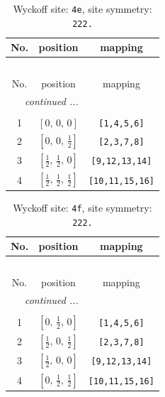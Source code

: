 \documentclass[fleqn,8pt]{jsarticle}
\begin{document}
\renewcommand{\arraystretch}{1.2}
\begin{longtable}{ccc}
\caption{Wyckoff site: {\tt 4e}, site symmetry: {\tt 222.}}
 \\
 \hline \hline
No. & position & mapping \\ \hline \endfirsthead

\multicolumn{2}{l}{\tablename\ \thetable{}} \\
 \hline \hline
No. & position & mapping \\ \hline \endhead

 \hline \hline
\multicolumn{2}{r}{\footnotesize\it continued ...} \\ \endfoot

 \hline \hline
\multicolumn{2}{r}{} \\ \endlastfoot

1 & $\left[ 0,\, 0,\, 0 \right]$ & {\tt [1,4,5,6]} \\ \hline
2 & $\left[ 0,\, 0,\, \frac{1}{2} \right]$ & {\tt [2,3,7,8]} \\ \hline
3 & $\left[ \frac{1}{2},\, \frac{1}{2},\, 0 \right]$ & {\tt [9,12,13,14]} \\ \hline
4 & $\left[ \frac{1}{2},\, \frac{1}{2},\, \frac{1}{2} \right]$ & {\tt [10,11,15,16]} \\
\end{longtable}
\renewcommand{\arraystretch}{1.2}
\begin{longtable}{ccc}
\caption{Wyckoff site: {\tt 4f}, site symmetry: {\tt 222.}}
 \\
 \hline \hline
No. & position & mapping \\ \hline \endfirsthead

\multicolumn{2}{l}{\tablename\ \thetable{}} \\
 \hline \hline
No. & position & mapping \\ \hline \endhead

 \hline \hline
\multicolumn{2}{r}{\footnotesize\it continued ...} \\ \endfoot

 \hline \hline
\multicolumn{2}{r}{} \\ \endlastfoot

1 & $\left[ 0,\, \frac{1}{2},\, 0 \right]$ & {\tt [1,4,5,6]} \\ \hline
2 & $\left[ \frac{1}{2},\, 0,\, \frac{1}{2} \right]$ & {\tt [2,3,7,8]} \\ \hline
3 & $\left[ \frac{1}{2},\, 0,\, 0 \right]$ & {\tt [9,12,13,14]} \\ \hline
4 & $\left[ 0,\, \frac{1}{2},\, \frac{1}{2} \right]$ & {\tt [10,11,15,16]} \\
\end{longtable}
\end{document}
